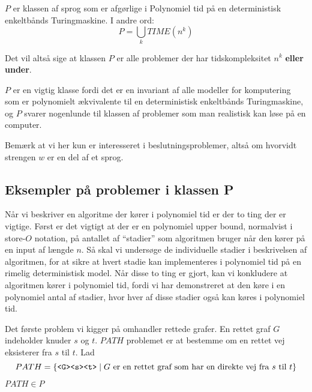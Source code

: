 \begin{definition}[Klassen $P$]
	$P$ er klassen af sprog som er afgørlige i Polynomiel tid på en deterministisk enkeltbånds Turingmaskine. I andre ord:
	\begin{equation*}
		P = \bigcup_{k} TIME(n^{k})
	\end{equation*}
\end{definition}

Det vil altså sige at klassen $P$ er alle problemer der har tidskompleksitet $n^{k}$ \textbf{eller under}.

$P$ er en vigtig klasse fordi det er en invariant af alle modeller for komputering som er polynomielt ækvivalente til en deterministisk enkeltbånds Turingmaskine, og $P$ svarer nogenlunde til klassen af problemer som man realistisk kan løse på en computer.

Bemærk at vi her kun er interesseret i beslutningsproblemer, altså om hvorvidt strengen $w$ er en del af et sprog.

\subsection{Eksempler på problemer i klassen P}%
\label{subsec:examplesinp}

Når vi beskriver en algoritme der kører i polynomiel tid er der to ting der er vigtige. Først er det vigtigt at der er en polynomiel upper bound, normalvist i store-$O$ notation, på antallet af ``stadier'' som algoritmen bruger når den kører på en input af længde $n$. Så skal vi undersøge de individuelle stadier i beskrivelsen af algoritmen, for at sikre at hvert stadie kan implementeres i polynomiel tid på en rimelig deterministisk model. Når disse to ting er gjort, kan vi konkludere at algoritmen kører i polynomiel tid, fordi vi har demonstreret at den køre i en polynomiel antal af stadier, hvor hver af disse stadier også kan køres i polynomiel tid.

Det første problem vi kigger på omhandler rettede grafer. En rettet graf $G$ indeholder knuder $s$ og $t$. $PATH$ problemet er at bestemme om en rettet vej eksisterer fra $s$ til $t$. Lad
\begin{equation*}
	PATH = \{\text{\texttt{<G><s><t>}} \mid G \text{ er en rettet graf som har en direkte vej fra } s \text{ til } t\}
\end{equation*}

\begin{theorem}
	$PATH \in P$
\end{theorem}

